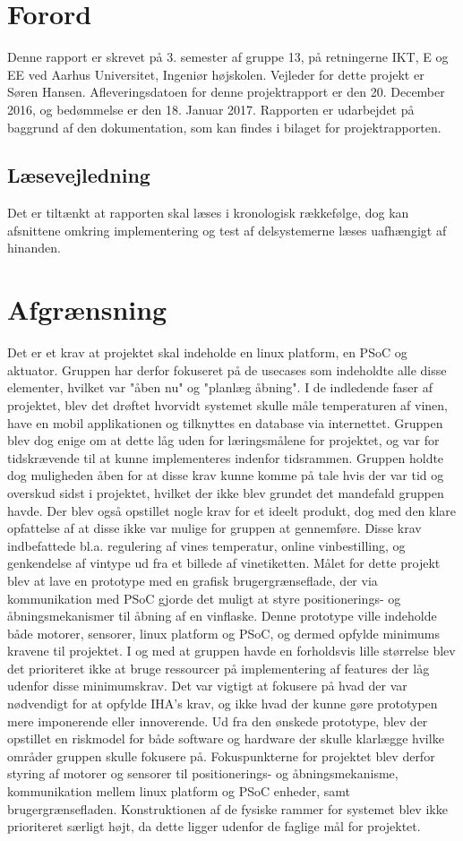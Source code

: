 \chapter{Forord}
Denne rapport er skrevet på 3. semester af gruppe 13, på retningerne IKT, E og EE ved Aarhus Universitet, Ingeniør højskolen. 
Vejleder for dette projekt er Søren Hansen. Afleveringsdatoen for denne projektrapport er den 20. December 2016, og bedømmelse er den 18. Januar 2017.
Rapporten er udarbejdet på baggrund af den dokumentation, som kan findes i bilaget for projektrapporten.

\section{Læsevejledning}
Det er tiltænkt at rapporten skal læses i kronologisk rækkefølge, dog kan afsnittene omkring implementering og test af delsystemerne læses
uafhængigt af hinanden. 

\chapter{Afgrænsning}
Det er et krav at projektet skal indeholde en linux platform, en PSoC og aktuator. Gruppen har derfor fokuseret på de usecases som indeholdte alle disse elementer, 
hvilket var "åben nu" og "planlæg åbning". I de indledende faser af projektet, blev det drøftet hvorvidt systemet skulle måle temperaturen af vinen, have en 
mobil applikationen og tilknyttes en database via internettet. Gruppen blev dog enige om at dette låg uden for læringsmålene for projektet, og var for 
tidskrævende til at kunne implementeres indenfor tidsrammen. Gruppen holdte dog muligheden åben for at disse krav kunne komme på tale hvis der var tid og 
overskud sidst i projektet, hvilket der ikke blev grundet det mandefald gruppen havde. 
Der blev også opstillet nogle krav for et ideelt produkt, dog med den klare opfattelse af at disse ikke var mulige for gruppen at gennemføre. Disse krav 
indbefattede bl.a. regulering af vines temperatur, online vinbestilling, og genkendelse af vintype ud fra et billede af vinetiketten. 
Målet for dette projekt blev at lave en prototype med en grafisk brugergrænseflade, der via kommunikation med PSoC gjorde det muligt at styre positionerings- 
og åbningsmekanismer til åbning af en vinflaske. Denne prototype ville indeholde både motorer, sensorer, linux platform og PSoC, og dermed opfylde minimums 
kravene til projektet. I og med at gruppen havde en forholdsvis lille størrelse blev det prioriteret ikke at bruge ressourcer på implementering af features der 
låg udenfor disse minimumskrav. Det var vigtigt at fokusere på hvad der var nødvendigt for at opfylde IHA's krav, og ikke hvad der kunne gøre prototypen mere 
imponerende eller innoverende. Ud fra den ønskede prototype, blev der opstillet en riskmodel for både software og hardware der skulle klarlægge hvilke områder 
gruppen skulle fokusere på. Fokuspunkterne for projektet blev derfor styring af motorer og sensorer til positionerings- og åbningsmekanisme, kommunikation mellem 
linux platform og PSoC enheder, samt brugergrænsefladen. Konstruktionen af de fysiske rammer for systemet blev ikke prioriteret særligt højt, da dette ligger 
udenfor de faglige mål for projektet.              
